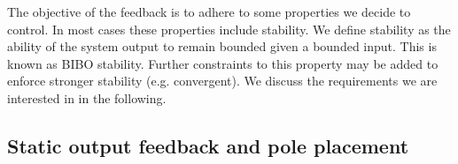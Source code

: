 \documentclass[sigconf]{llncs}
\begin{document}
The objective of the feedback is to adhere to some properties we decide to control.
In most cases these properties include stability.  We define stability as the ability of
the system output to remain bounded given a bounded input. This is known as BIBO
stability. Further constraints to this property may be added to enforce stronger stability 
(e.g. convergent).  We discuss the requirements we are interested in in the following.
\subsection{Static output feedback and pole placement} \label{sec:pole_place}
\end{document}
